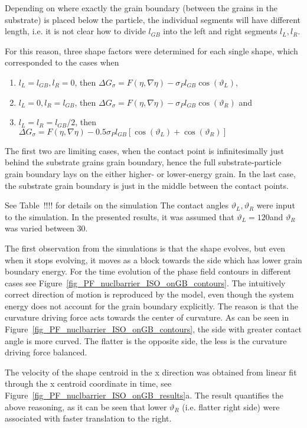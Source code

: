 Depending on where exactly the grain boundary (between the grains in the substrate) is placed below the particle, the individual segments will have different length, i.e. it is not clear how to divide $l_{GB}$ into the left and right segments $l_{L},l_{R}$.

For this reason, three shape factors were determined for each single shape, which corresponded to the cases when 
\begin{enumerate}
	\item $l_L = l_{GB}, l_R = 0$, then $\Delta G_\sigma = F(\eta,\nabla\eta)- \sigma_Pl_{GB}\cos(\vartheta_L)$,
	\item $l_L = 0, l_R = l_{GB}$, then $\Delta G_\sigma = F(\eta,\nabla\eta)- \sigma_Pl_{GB}\cos(\vartheta_R)$ and
	\item $l_L = l_R = l_{GB}/2$, then $\Delta G_\sigma = F(\eta,\nabla\eta)- 0.5\sigma_Pl_{GB}[\cos(\vartheta_L)+\cos(\vartheta_R)]$
\end{enumerate}
The first two are limiting cases, when the contact point is infinitesimally just behind the substrate grains grain boundary, hence the full substrate-particle grain boundary lays on the either higher- or lower-energy grain. In the last case, the substrate grain boundary is just in the middle between the contact points.

\alert{See Table~!!!! for details on the simulation} The contact angles $\vartheta_L,\vartheta_R$ were input to the simulation. In the presented results, it was assumed that $\vartheta_L=120$\textdegree and $\vartheta_R$ was varied between 30\textdegree.

The first observation from the simulations is that the shape evolves, but even when it stops evolving, it moves as a block towards the side which has lower grain boundary energy. For the time evolution of the phase field contours in different cases see Figure~\ref{fig_PF_nuclbarrier_ISO_onGB_contours}. The intuitively correct direction of motion is reproduced by the model, even though the system energy does not account for the grain boundary explicitly. The reason is that the curvature driving force acts towards the center of curvature. As can be seen in Figure~\ref{fig_PF_nuclbarrier_ISO_onGB_contours}, the side with greater contact angle is more curved. The flatter is the opposite side, the less is the curvature driving force balanced. 

The velocity of the shape centroid in the x direction was obtained from linear fit through the x centroid coordinate in time, see Figure~\ref{fig_PF_nuclbarrier_ISO_onGB_results}a. The result quantifies the above reasoning, as it can be seen that lower $\vartheta_R$ (i.e. flatter right side) were associated with faster translation to the right.

